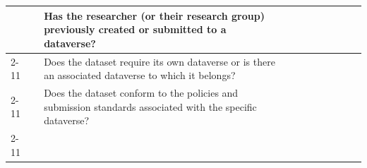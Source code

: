 \begin{table}[]
\begin{tabular}{|l|l|l|lllll|l|l|l|}
                                                               &                                                                                                                                         & Has the researcher (or their research group) previously created or submitted to a dataverse?                                                 & \multicolumn{1}{l|}{}                                       & \multicolumn{1}{l|}{}                                                                           & \multicolumn{1}{l|}{}                                                                            & \multicolumn{1}{l|}{}                                                            &                                                             &                                                                                            &                                        &                     \\ \cline{2-11} 
                                                               &                                                                                                                                         & Does the dataset require its own dataverse or is there an associated dataverse to which it belongs?                                          & \multicolumn{1}{l|}{}                                       & \multicolumn{1}{l|}{}                                                                           & \multicolumn{1}{l|}{}                                                                            & \multicolumn{1}{l|}{}                                                            &                                                             &                                                                                            &                                        &                     \\ \cline{2-11} 
                                                               &                                                                                                                                         & Does the dataset conform to the policies and submission standards associated with the specific dataverse?                                    & \multicolumn{1}{l|}{}                                       & \multicolumn{1}{l|}{}                                                                           & \multicolumn{1}{l|}{}                                                                            & \multicolumn{1}{l|}{}                                                            &                                                             &                                                                                            &                                        &                     \\ \cline{2-11} 

\end{tabular}
\end{table}
